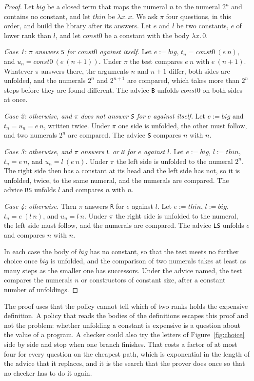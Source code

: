 \documentclass[acmsmall,nonacm,screen]{acmart}
\newcommand{\nm}[1]{\mathit{#1}}
\newcommand{\lamx}[1]{\lambda #1.\,}
\newcommand{\adv}[1]{\textup{\texttt{#1}}}
\begin{document}
\begin{proof}
Let $\nm{big}$ be a closed term that maps the numeral $n$ to the numeral $2^n$ and contains
no constant, and let $\nm{thin}$ be $\lamx{x} x$. We ask $\pi$ four questions, in this order,
and build the library after its answers. Let $e$ and $l$ be two constants, $e$ of lower rank
than $l$, and let $\nm{const0}$ be a constant with the body $\lamx{x} 0$.

\emph{Case 1: $\pi$ answers \adv{S} for $\nm{const0}$ against itself.} Let $e := \nm{big}$,
$t_n = \nm{const0}\ (e\ n)$, and $u_n = \nm{const0}\ (e\ (n + 1))$. Under $\pi$ the test
compares $e\ n$ with $e\ (n+1)$. Whatever $\pi$ answers there, the arguments $n$ and $n + 1$
differ, both sides are unfolded, and the numerals $2^n$ and $2^{n+1}$ are compared, which
takes more than $2^n$ steps before they are found different. The advice \adv{B} unfolds
$\nm{const0}$ on both sides at once.

\emph{Case 2: otherwise, and $\pi$ does not answer \adv{S} for $e$ against itself.} Let
$e := \nm{big}$ and $t_n = u_n = e\ n$, written twice. Under $\pi$ one side is unfolded, the
other must follow, and two numerals $2^n$ are compared. The advice \adv{S} compares $n$ with
$n$.

\emph{Case 3: otherwise, and $\pi$ answers \adv{L} or \adv{B} for $e$ against $l$.} Let
$e := \nm{big}$, $l := \nm{thin}$, $t_n = e\ n$, and $u_n = l\ (e\ n)$. Under $\pi$ the left
side is unfolded to the numeral $2^n$. The right side then has a constant at its head and the
left side has not, so it is unfolded, twice, to the same numeral, and the numerals are
compared. The advice \adv{RS} unfolds $l$ and compares $n$ with $n$.

\emph{Case 4: otherwise.} Then $\pi$ answers \adv{R} for $e$ against $l$. Let
$e := \nm{thin}$, $l := \nm{big}$, $t_n = e\ (l\ n)$, and $u_n = l\ n$. Under $\pi$ the right
side is unfolded to the numeral, the left side must follow, and the numerals are compared.
The advice \adv{LS} unfolds $e$ and compares $n$ with $n$.

In each case the body of $\nm{big}$ has no constant, so that the test meets no further
choice once $\nm{big}$ is unfolded, and the comparison of two numerals takes at least as many
steps as the smaller one has successors. Under the advice named, the test compares the
numerals $n$ or constructors of constant size, after a constant number of unfoldings.
\end{proof}

The proof uses that the policy cannot tell which of two ranks holds the expensive
definition. A policy that reads the bodies of the definitions escapes this proof and not the
problem: whether unfolding a constant is expensive is a question about the value of a
program. A checker could also try the letters of Figure~\ref{fig:choice} side by side and
stop when one branch finishes. That costs a factor of at most four for every question on the
cheapest path, which is exponential in the length of the advice that it replaces, and it is
the search that the prover does once so that no checker has to do it again.
\end{document}
